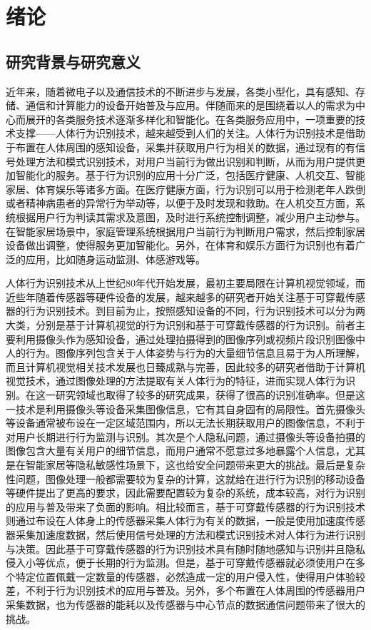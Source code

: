 ﻿
\chapter{绪论}
\section{研究背景与研究意义}
\par 近年来，随着微电子以及通信技术的不断进步与发展，各类小型化，具有感知、存储、通信和计算能力的设备开始普及与应用。伴随而来的是围绕着以人的需求为中心而展开的各类服务技术逐渐多样化和智能化。在各类服务应用中，一项重要的技术支撑——人体行为识别技术，越来越受到人们的关注。人体行为识别技术是借助于布置在人体周围的感知设备，采集并获取用户行为相关的数据，通过现有的有信号处理方法和模式识别技术，对用户当前行为做出识别和判断，从而为用户提供更加智能化的服务。基于行为识别的应用十分广泛，包括医疗健康、人机交互、智能家居、体育娱乐等诸多方面。在医疗健康方面，行为识别可以用于检测老年人跌倒或者精神病患者的异常行为举动等，以便于及时发现和救助。在人机交互方面，系统根据用户行为判读其需求及意图，及时进行系统控制调整，减少用户主动参与。在智能家居场景中，家庭管理系统根据用户当前行为判断用户需求，然后控制家居设备做出调整，使得服务更加智能化。另外，在体育和娱乐方面行为识别也有着广泛的应用，比如随身运动监测、体感游戏等。

\par 人体行为识别技术从上世纪80年代开始发展，最初主要局限在计算机视觉领域，而近些年随着传感器等硬件设备的发展，越来越多的研究者开始关注基于可穿戴传感器的行为识别技术。到目前为止，按照感知设备的不同，行为识别技术可以分为两大类，分别是基于计算机视觉的行为识别和基于可穿戴传感器的行为识别。前者主要利用摄像头作为感知设备，通过处理拍摄得到的图像序列或视频片段识别图像中人的行为。图像序列包含关于人体姿势与行为的大量细节信息且易于为人所理解，而且计算机视觉相关技术发展也日臻成熟与完善，因此较多的研究者借助于计算机视觉技术，通过图像处理的方法提取有关人体行为的特征，进而实现人体行为识别。在这一研究领域也取得了较多的研究成果，获得了很高的识别准确率。但是这一技术是利用摄像头等设备采集图像信息，它有其自身固有的局限性。首先摄像头等设备通常被布设在一定区域范围内，所以无法长期获取用户的图像信息，不利于对用户长期进行行为监测与识别。其次是个人隐私问题，通过摄像头等设备拍摄的图像包含大量有关用户的细节信息，而用户通常不愿意过多地暴露个人信息，尤其是在智能家居等隐私敏感性场景下，这也给安全问题带来更大的挑战。最后是复杂性问题，图像处理一般都需要较为复杂的计算，这就给在进行行为识别的移动设备等硬件提出了更高的要求，因此需要配置较为复杂的系统，成本较高，对行为识别的应用与普及带来了负面的影响。相比较而言，基于可穿戴传感器的行为识别技术则通过布设在人体身上的传感器采集人体行为有关的数据，一般是使用加速度传感器采集加速度数据，然后使用信号处理的方法和模式识别技术对人体行为进行识别与决策。因此基于可穿戴传感器的行为识别技术具有随时随地感知与识别并且隐私侵入小等优点，便于长期的行为监测。但是，基于可穿戴传感器就必须使用户在多个特定位置佩戴一定数量的传感器，必然造成一定的用户侵入性，使得用户体验较差，不利于行为识别技术的应用与普及。另外，多个布置在人体周围的传感器用户采集数据，也为传感器的能耗以及传感器与中心节点的数据通信问题带来了很大的挑战。

